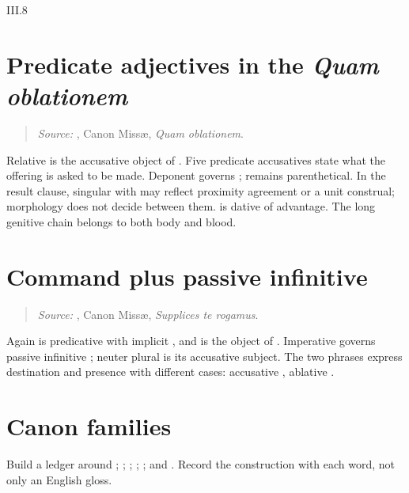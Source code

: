 \begin{courseunit}{III.8}
\section{Predicate adjectives in the \emph{Quam oblationem}}

\begin{quote}

\emph{Source:} \Missal, Canon Missæ, \emph{Quam oblationem}.
\end{quote}

Relative  is the accusative object of .
Five predicate accusatives state what the offering is asked to be made.
Deponent  governs ;  remains
parenthetical. In the result clause, singular  with  may reflect proximity agreement or a unit construal; morphology
does not decide between them.  is dative of advantage. The long
genitive chain belongs to both body and blood.

\section{Command plus passive infinitive}

\begin{quote}

\emph{Source:} \Missal, Canon Missæ, \emph{Supplices te rogamus}.
\end{quote}

Again  is predicative with implicit , and
 is the object of . Imperative  governs
passive infinitive ; neuter plural  is its
accusative subject. The two  phrases express destination and presence
with different cases: accusative , ablative
.

\section{Canon families}

Build a ledger around ; ; ; ; ; and . Record the construction with each word, not only an English gloss.




\end{courseunit}

